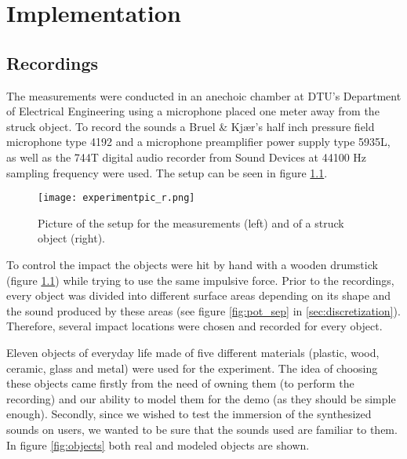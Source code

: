 \chapter{Implementation}\label{ch:implementation}


%

\section{Recordings}\label{sec:recordings}

The measurements were conducted in an anechoic chamber at \gls{DTU}'s Department of Electrical Engineering using a microphone placed one meter away from the struck object. To record the sounds a Bruel \& Kjær's half inch pressure field microphone type 4192 and a microphone preamplifier power supply type 5935L, as well as the 744T digital audio recorder from Sound Devices at 44100 Hz sampling frequency were used. The setup can be seen in figure \ref{fig:experiment}.

\begin{figure}[H]
  \centering
    \texttt{[image: experimentpic\_r.png]}
      \caption{Picture of the setup for the measurements (left) and of a struck object (right).}\label{fig:experiment}
\end{figure}

To control the impact the objects were hit by hand with a wooden drumstick (figure \ref{fig:experiment}) while trying to use the same impulsive force. Prior to the recordings, every object was divided into different surface areas depending on its shape and the sound produced by these areas (see figure \ref{fig:pot_sep} in \ref{sec:discretization}). Therefore, several impact locations were chosen and recorded for every object.

Eleven objects of everyday life made of five different materials (plastic, wood, ceramic, glass and metal) were used for the experiment. The idea of choosing these objects came firstly from the need of owning them (to perform the recording) and our ability to model them for the demo (as they should be simple enough). Secondly, since we wished to test the immersion of the synthesized sounds on users, we wanted to be sure that the sounds used are familiar to them. In figure \ref{fig:objects} both real and modeled objects are shown. 

